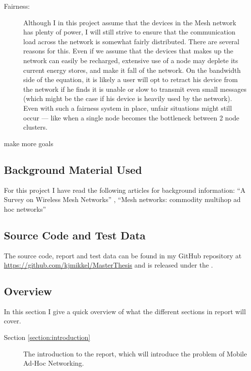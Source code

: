 \begin{description}
\item[Fairness:] Although I in this project assume that the devices in the Mesh network has plenty of power, I will still strive to ensure that the communication load across the network is somewhat fairly distributed. There are several reasons for this. Even if we assume that the devices that makes up the network can easily be recharged, extensive use of a node may deplete its current energy stores, and make it fall of the network. On the bandwidth side of the equation, it is likely a user will opt to retract his device from the network if he finds it is unable or slow to transmit even small messages (which might be the case if his device is heavily used by the network). Even with such a fairness system in place, unfair situations might still occur --- like when a single node becomes the bottleneck between 2 node clusters. 
\item[make more goals] 
\end{description}

\subsection{Background Material Used}
For this project I have read the following articles for background information: ``A Survey on Wireless Mesh Networks'' \cite{martinWirelessSurvey}, ``Mesh networks: commodity multihop ad hoc networks''\cite{martinMeshnetwork} 

\subsection{Source Code and Test Data}
The source code, report and test data can be found in my GitHub repository at \url{https://github.com/kjmikkel/MasterThesis} and is released under the .

\subsection{Overview}
In this section I give a quick overview of what the different sections in report will cover.
\begin{description}
\item[Section \ref{section:introduction}] The introduction to the report, which will introduce the problem of Mobile Ad-Hoc Networking.
\item[]
\end{description}
